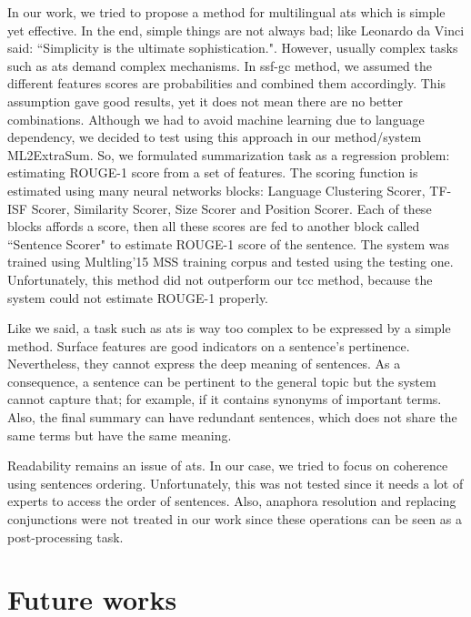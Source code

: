 In our work, we tried to propose a method for multilingual \ac{ats} which is simple yet effective.
In the end, simple things are not always bad;  like Leonardo da Vinci said: ``Simplicity is the ultimate sophistication.".
However, usually complex tasks such as \ac{ats} demand complex mechanisms. 
In \ac{ssf-gc} method, we assumed the different features scores are probabilities and combined them accordingly.
This assumption gave good results, yet it does not mean there are no better combinations. 
Although we had to avoid machine learning due to language dependency, we decided to test using this approach in our method/system ML2ExtraSum. 
So, we formulated summarization task as a regression problem: estimating ROUGE-1 score from a set of features. 
The scoring function is estimated using many neural networks blocks: Language Clustering Scorer, TF-ISF Scorer, Similarity Scorer, Size Scorer and Position Scorer. 
Each of these blocks affords a score, then all these scores are fed to another block called ``Sentence Scorer" to estimate ROUGE-1 score of the sentence.
The system was trained using Multling'15 MSS training corpus and tested using the testing one. 
Unfortunately, this method did not outperform our \ac{tcc} method, because the system could not estimate ROUGE-1 properly. 

Like we said, a task such as \ac{ats} is way too complex to be expressed by a simple method. 
Surface features are good indicators on a sentence's pertinence. 
Nevertheless, they cannot express the deep meaning of sentences. 
As a consequence, a sentence can be pertinent to the general topic but the system cannot capture that; for example, if it contains synonyms of important terms.
Also, the final summary can have redundant sentences, which does not share the same terms but have the same meaning.


Readability remains an issue of \ac{ats}. 
In our case, we tried to focus on coherence using sentences ordering. 
Unfortunately, this was not tested since it needs a lot of experts to access the order of sentences. 
Also, anaphora resolution and replacing conjunctions were not treated in our work since these operations can be seen as a post-processing task.


\section{Future works}

